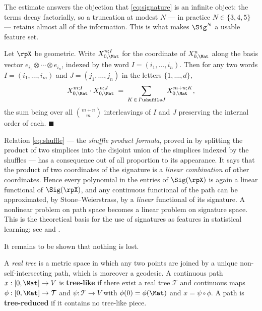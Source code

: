 \medskip

The estimate answers the objection that \eqref{eq:signature} is an infinite object: the terms decay
factorially, so a truncation at modest $N$ --- in practice $N \in \{3,4,5\}$ --- retains almost all
of the information. This is what makes $\Sig^N$ a usable feature set.

\begin{proposition}\label{prop:shuffle}
Let $\rpX$ be geometric. Write $X^{n;I}_{0,\Mat}$ for the coordinate of $X^{n}_{0,\Mat}$ along the
basis vector $e_{i_1}\otimes\cdots\otimes e_{i_n}$, indexed by the word $I = (i_1,\dots,i_n)$. Then
for any two words $I = (i_1,\dots,i_m)$ and $J = (j_1,\dots,j_n)$ in
the letters $\{1,\dots,d\}$,
\begin{equation}\label{eq:shuffle}
X^{m;I}_{0,\Mat}\cdot X^{n;J}_{0,\Mat} \;=\; \sum_{K \,\in\, I \shuffle J} X^{m+n;K}_{0,\Mat},
\end{equation}
the sum being over all $\binom{m+n}{m}$ interleavings of $I$ and $J$ preserving the internal order
of each. \hfill $\blacksquare$
\end{proposition}

Relation \eqref{eq:shuffle} --- the \emph{shuffle product formula}, proved in \cite[Lem.\ 1.15]{geng2021}
by splitting the product of two simplices into the disjoint union of the simplices indexed by the
shuffles --- has a consequence out of all proportion to its appearance. It says that the product of
two coordinates of the signature is a \emph{linear combination} of other coordinates. Hence every
polynomial in the entries of $\Sig(\rpX)$ is again a linear functional of $\Sig(\rpX)$, and any
continuous functional of the path can be approximated, by Stone--Weierstrass, by a \emph{linear}
functional of its signature. A nonlinear problem on path space becomes a linear problem on signature
space. This is the theoretical basis for the use of signatures as features in statistical learning;
see \cite{chevyrevkormilitzin2016} and \cite{levinlyonsni2013}.

It remains to be shown that nothing is lost.

\begin{definition}\label{def:treelike}
A \emph{real tree} is a metric space in which any two points are joined by a unique
non-self-intersecting path, which is moreover a geodesic. A continuous path $x:[0,\Mat]\to V$ is
\textbf{tree-like} if there exist a real tree $\mathcal{T}$ and continuous maps
$\phi : [0,\Mat]\to\mathcal{T}$ and $\psi:\mathcal{T}\to V$ with $\phi(0)=\phi(\Mat)$ and
$x = \psi\circ\phi$. A path is \textbf{tree-reduced} if it contains no tree-like piece.
\end{definition}


